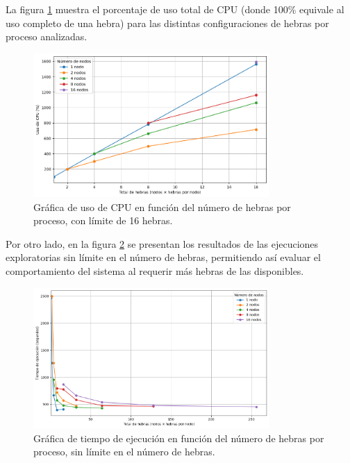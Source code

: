 La figura \ref{fig:exploratory_threads_limit_cpu} muestra el porcentaje de uso total de CPU (donde 100\% equivale al uso completo de una hebra) para las distintas configuraciones de hebras por proceso analizadas.

\begin{figure}[ht]
    \centering
    \includegraphics[width=0.8\textwidth]{imagenes/cap5/exploratory_threads_limit_cpu.png}
    \caption{Gráfica de uso de CPU en función del número de hebras por proceso, con límite de 16 hebras.}
    \label{fig:exploratory_threads_limit_cpu}
\end{figure}

Por otro lado, en la figura \ref{fig:exploratory_threads_no-limit_time} se presentan los resultados de las ejecuciones exploratorias sin límite en el número de hebras, permitiendo así evaluar el comportamiento del sistema al requerir más hebras de las disponibles.

\begin{figure}[ht]
    \centering
    \includegraphics[width=0.8\textwidth]{imagenes/cap5/exploratory_threads_no-limit_time.png}
    \caption{Gráfica de tiempo de ejecución en función del número de hebras por proceso, sin límite en el número de hebras.}
    \label{fig:exploratory_threads_no-limit_time}
\end{figure}

